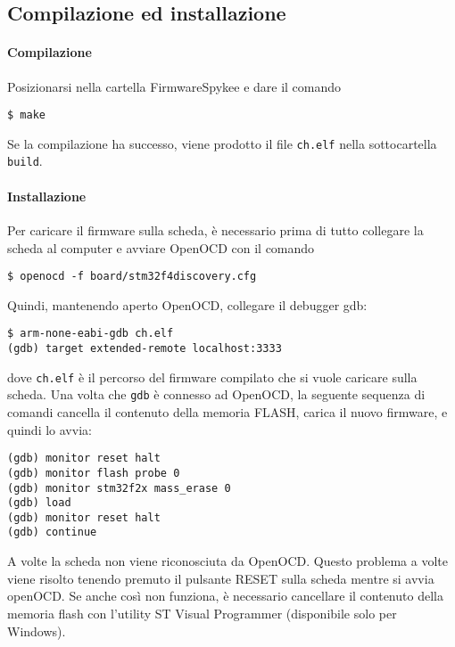 \subsection*{Compilazione ed installazione}

\paragraph{Compilazione} Posizionarsi nella cartella FirmwareSpykee e dare il comando
\begin{verbatim}
$ make
\end{verbatim}
Se la compilazione ha successo, viene prodotto il file \verb|ch.elf| nella sottocartella \verb|build|.

\paragraph{Installazione} Per caricare il firmware sulla scheda, è necessario prima di tutto collegare la scheda al computer e avviare OpenOCD con il comando
\begin{verbatim}
$ openocd -f board/stm32f4discovery.cfg
\end{verbatim}
Quindi, mantenendo aperto OpenOCD, collegare il debugger gdb:
\begin{verbatim}
$ arm-none-eabi-gdb ch.elf
(gdb) target extended-remote localhost:3333
\end{verbatim}
dove \verb|ch.elf| è il percorso del firmware compilato che si vuole caricare sulla scheda. Una volta che \verb|gdb| è connesso ad OpenOCD, la seguente sequenza di comandi cancella il contenuto della memoria FLASH, carica il nuovo firmware, e quindi lo avvia:
\begin{verbatim}
(gdb) monitor reset halt
(gdb) monitor flash probe 0 
(gdb) monitor stm32f2x mass_erase 0 
(gdb) load 
(gdb) monitor reset halt 
(gdb) continue
\end{verbatim}

\begin{nota} A volte la scheda non viene riconosciuta da OpenOCD. Questo problema a volte viene risolto tenendo premuto il pulsante RESET sulla scheda mentre si avvia openOCD. Se anche così non funziona, è necessario cancellare il contenuto della memoria flash con l'utility ST Visual Programmer (disponibile solo per Windows).
\end{nota}

